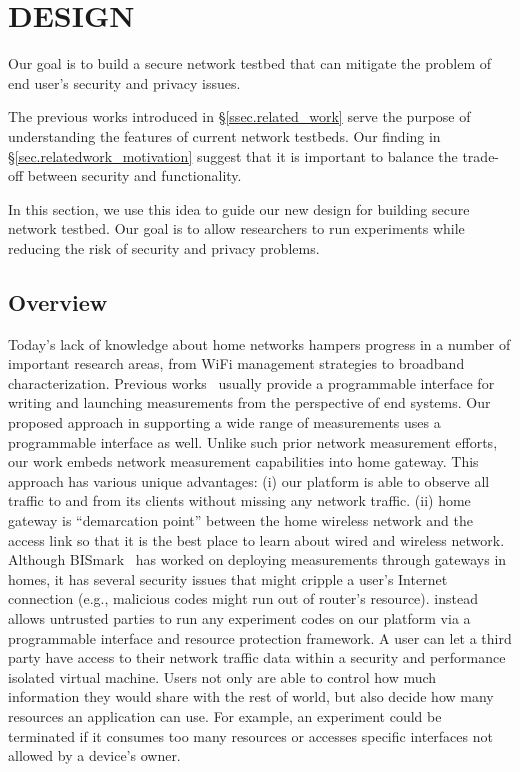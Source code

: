 \chapter{\sysname DESIGN}
\label{sec.design}
Our goal is to build a secure network testbed that can mitigate the problem 
of end user's security and privacy issues. 

The previous works introduced in \S{\ref{ssec.related_work}} serve the purpose of understanding the features of current network testbeds. Our finding in \S{\ref{sec.relatedwork_motivation}} suggest that it is important to balance the trade-off between security and functionality.

In this section, we use this idea to guide our new design for building secure network testbed. Our goal is to allow researchers to run experiments while reducing the risk of security and privacy problems.

\section{Overview}
Today's lack of knowledge about home networks hampers progress in a number of important research areas, from WiFi management strategies to broadband characterization. Previous works~\cite{sanchez2014measurement,dhawan2012fathom} usually provide a programmable interface for writing and launching measurements from the perspective of end systems. Our proposed approach in supporting a wide range of measurements uses a programmable interface as well. Unlike such prior network measurement efforts, our work embeds network measurement capabilities into home gateway. This approach has various unique advantages: (i) our platform is able to observe all traffic to and from its clients without missing any network traffic. (ii) home gateway is ``demarcation point'' between the home wireless network and the access link so that it is the best place to learn about wired and wireless network. Although BISmark~\cite{183951} has worked on deploying measurements through gateways in homes, it has several security issues that might cripple a user's Internet connection (e.g., malicious codes might run out of router's resource). \sysname instead allows untrusted parties to run any experiment codes on our platform via a programmable interface and resource protection framework. A user can let a third party have access to their network traffic data within a security and performance isolated virtual machine. Users not only are able to control how much information they would share with the rest of world, but also decide how many resources an application can use. For example, an experiment could be terminated if it consumes too many resources or accesses specific interfaces not allowed by a device's owner. 

